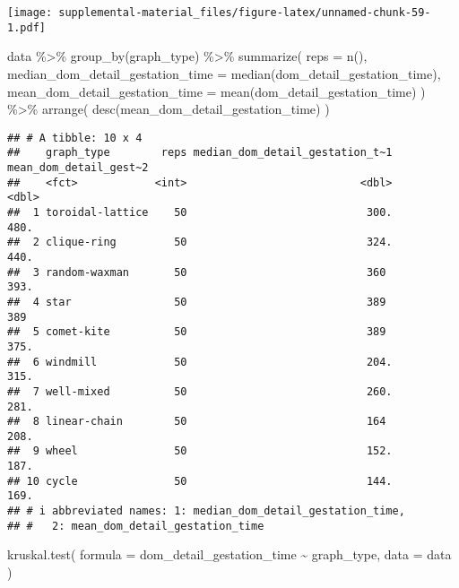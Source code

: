 \documentclass[
]{book}
\newenvironment{Shaded}{\begin{snugshade}}{\end{snugshade}}
\newcommand{\AttributeTok}[1]{\textcolor[rgb]{0.77,0.63,0.00}{#1}}
\newcommand{\FunctionTok}[1]{\textcolor[rgb]{0.00,0.00,0.00}{#1}}
\newcommand{\NormalTok}[1]{#1}
\newcommand{\SpecialCharTok}[1]{\textcolor[rgb]{0.00,0.00,0.00}{#1}}
\begin{document}
\texttt{[image: supplemental-material\_files/figure-latex/unnamed-chunk-59-1.pdf]}

\begin{Shaded}
\begin{Highlighting}[]
\NormalTok{data }\SpecialCharTok{\%\textgreater{}\%}
  \FunctionTok{group\_by}\NormalTok{(graph\_type) }\SpecialCharTok{\%\textgreater{}\%}
  \FunctionTok{summarize}\NormalTok{(}
    \AttributeTok{reps =} \FunctionTok{n}\NormalTok{(),}
    \AttributeTok{median\_dom\_detail\_gestation\_time =} \FunctionTok{median}\NormalTok{(dom\_detail\_gestation\_time),}
    \AttributeTok{mean\_dom\_detail\_gestation\_time =} \FunctionTok{mean}\NormalTok{(dom\_detail\_gestation\_time)}
\NormalTok{  ) }\SpecialCharTok{\%\textgreater{}\%}
  \FunctionTok{arrange}\NormalTok{(}
    \FunctionTok{desc}\NormalTok{(mean\_dom\_detail\_gestation\_time)}
\NormalTok{  )}
\end{Highlighting}
\end{Shaded}

\begin{verbatim}
## # A tibble: 10 x 4
##    graph_type        reps median_dom_detail_gestation_t~1 mean_dom_detail_gest~2
##    <fct>            <int>                           <dbl>                  <dbl>
##  1 toroidal-lattice    50                            300.                   480.
##  2 clique-ring         50                            324.                   440.
##  3 random-waxman       50                            360                    393.
##  4 star                50                            389                    389 
##  5 comet-kite          50                            389                    375.
##  6 windmill            50                            204.                   315.
##  7 well-mixed          50                            260.                   281.
##  8 linear-chain        50                            164                    208.
##  9 wheel               50                            152.                   187.
## 10 cycle               50                            144.                   169.
## # i abbreviated names: 1: median_dom_detail_gestation_time,
## #   2: mean_dom_detail_gestation_time
\end{verbatim}

\begin{Shaded}
\begin{Highlighting}[]
\FunctionTok{kruskal.test}\NormalTok{(}
  \AttributeTok{formula =}\NormalTok{ dom\_detail\_gestation\_time }\SpecialCharTok{\textasciitilde{}}\NormalTok{ graph\_type,}
  \AttributeTok{data =}\NormalTok{ data}
\NormalTok{)}
\end{Highlighting}
\end{Shaded}
\end{document}
